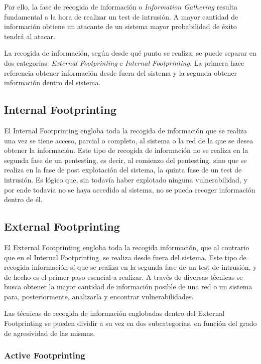 Por ello, la fase de recogida de información o \textit{Information Gathering} resulta fundamental a la hora de realizar un test de intrusión. A mayor cantidad de información obtiene un atacante de un sistema mayor probabilidad de éxito tendrá al atacar.

La recogida de información, según desde qué punto se realiza, se puede separar en dos categorías: \textit{External Footprinting} e \textit{Internal Footprinting}. La primera hace referencia obtener información desde fuera del sistema y la segunda obtener información dentro del sistema.

\subsection{Internal Footprinting}

El Internal Footprinting engloba toda la recogida de información que se realiza una vez se tiene acceso, parcial o completo, al sistema o la red de la que se desea obtener la información. Este tipo de recogida de información no se realiza en la segunda fase de un pentesting, es decir, al comienzo del pentesting, sino que se realiza en la fase de post explotación del sistema, la quinta fase de un test de intrusión. Es lógico que, sin todavía haber explotado ninguna vulnerabilidad, y por ende todavía no se haya accedido al sistema, no se pueda recoger información dentro de él.

\subsection{External Footprinting}

El External Footprinting engloba toda la recogida información, que al contrario que en el Internal Footprinting, se realiza desde fuera del sistema. Este tipo de recogida información sí que se realiza en la segunda fase de un test de intrusión, y de hecho es el primer paso esencial a realizar. A través de diversas técnicas se busca obtener la mayor cantidad de información posible de una red o un sistema para, posteriormente, analizarla y encontrar vulnerabilidades.

Las técnicas de recogida de información englobadas dentro del External Footprinting se pueden dividir a su vez en dos subcategorías, en función del grado de agresividad de las mismas. 

\subsubsection{Active Footprinting}

